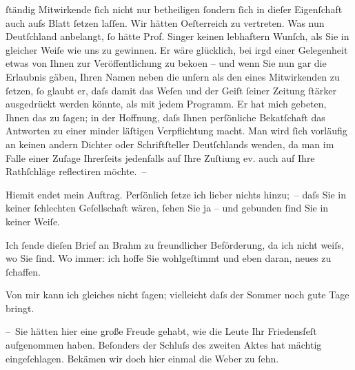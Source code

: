                ſtändig Mitwirkende ſich nicht nur betheiligen ſondern ſich in dieſer Eigenſchaft
               auch aufs Blatt ſetzen laſſen. Wir hätten Oeſterreich zu vertreten. Was nun Deutſchland anbelangt, ſo hätte Prof. Singer keinen lebhaftern Wunſch, als Sie {\pb}in gleicher Weiſe wie uns zu gewinnen. Er wäre
               glücklich, bei irgd einer Gelegenheit etwas von Ihnen zur Veröffentlichung zu beko{\geminationm}en – und wenn Sie nun gar die Erlaubnis gäben, Ihren
               Namen neben die unſern als den eines Mitwirkenden zu ſetzen, ſo glaubt er, daſs damit
               das Weſen und der Geiſt ſeiner Zeitung ſtärker {\pb}ausgedrückt werden könnte, als mit jedem Programm. Er hat mich gebeten, Ihnen das
               zu ſagen; in der Hoffnung, daſs Ihnen perſönliche Beka{\geminationn}tſchaft das Antworten zu einer minder läſtigen Verpflichtung macht. Man wird ſich
               vorläufig an keinen andern Dichter oder Schriftſteller Deutſch{\pb}lands wenden, da man im
               Falle einer Zuſage Ihrerſeits jedenfalls auf Ihre Zuſti{\geminationm}ung ev. auch auf Ihre Rathſchläge reflectiren möchte. –\pend
           
\pstart
           Hiemit endet mein Auftrag. Perſönlich ſetze ich lieber nichts hinzu; – daſs Sie in
               keiner ſchlechten Geſellschaft wären, ſehen Sie ja – und gebunden ſind {\pb}Sie in keiner Weiſe.\pend
           
\pstart
           Ich ſende dieſen Brief an Brahm zu
               freundlicher Beförderung, da ich nicht weiſs, wo Sie ſind. Wo immer: ich hoffe Sie
               wohlgeſtimmt und eben daran, neues zu ſchaffen.\pend
           
\pstart
           Von mir kann ich gleiches nicht ſagen; vielleicht daſs der Sommer noch gute Tage bringt.\pend
           
\pstart
           {\pb}– Sie hätten hier eine große Freude gehabt,
               wie die Leute Ihr Friedensfeſt aufgenommen
               haben. Beſonders der Schluſs des zweiten Aktes hat mächtig eingeſchlagen. Bekämen wir
               doch hier einmal die Weber zu ſehn.\pend
           
